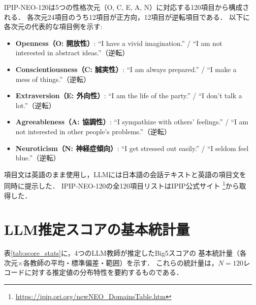 \documentclass[dvipdfmx,11pt,a4paper]{bxjsarticle}
\begin{document}
IPIP-NEO-120は5つの性格次元（O, C, E, A, N）に対応する120項目から構成される．
各次元24項目のうち12項目が正方向，12項目が逆転項目である．
以下に各次元の代表的な項目例を示す:
\begin{itemize}
  \item \textbf{Openness（O: 開放性）}: ``I have a vivid imagination.'' / ``I am not interested in abstract ideas.''（逆転）
  \item \textbf{Conscientiousness（C: 誠実性）}: ``I am always prepared.'' / ``I make a mess of things.''（逆転）
  \item \textbf{Extraversion（E: 外向性）}: ``I am the life of the party.'' / ``I don't talk a lot.''（逆転）
  \item \textbf{Agreeableness（A: 協調性）}: ``I sympathize with others' feelings.'' / ``I am not interested in other people's problems.''（逆転）
  \item \textbf{Neuroticism（N: 神経症傾向）}: ``I get stressed out easily.'' / ``I seldom feel blue.''（逆転）
\end{itemize}

項目文は英語のまま使用し，LLMには日本語の会話テキストと英語の項目文を同時に提示した．
IPIP-NEO-120の全120項目リストはIPIP公式サイト%
\footnote{\url{https://ipip.ori.org/newNEO_DomainsTable.htm}}から取得した．

\section{LLM推定スコアの基本統計量}
\label{sec:appendix_score_stats}

表\ref{tab:score_stats}に，4つのLLM教師が推定したBig5スコアの
基本統計量（各次元$\times$各教師の平均・標準偏差・範囲）を示す．
これらの統計量は，$N = 120$レコードに対する推定値の分布特性を要約するものである．
\end{document}
